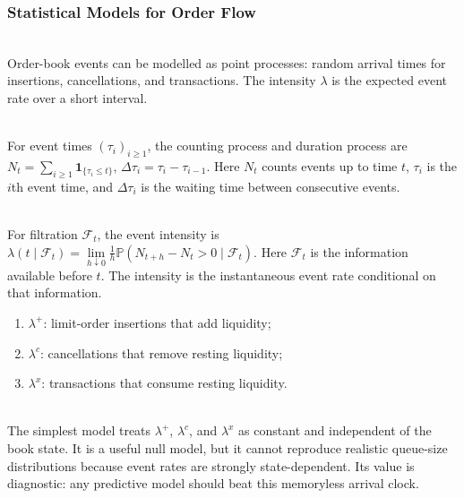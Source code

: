 \subsubsection{Statistical Models for Order Flow}

\begin{definition} \\
Order-book events can be modelled as point processes: random arrival times for insertions, cancellations, and transactions. The intensity $\lambda$ is the expected event rate over a short interval.
\end{definition}

\begin{definition} \\
For event times $(\tau_i)_{i\geq1}$, the counting process and duration process are $N_t=\sum\limits_{i\geq1}\mathbf{1}_{\{\tau_i\leq t\}}$, $\Delta\tau_i=\tau_i-\tau_{i-1}$. Here $N_t$ counts events up to time $t$, $\tau_i$ is the $i$th event time, and $\Delta\tau_i$ is the waiting time between consecutive events.
\end{definition}

\begin{definition} \\
For filtration $\mathcal{F}_t$, the event intensity is $\lambda(t\mid\mathcal{F}_t)=\lim\limits_{h\downarrow0}\frac{1}{h}\mathbb{P}(N_{t+h}-N_t>0\mid\mathcal{F}_t)$. Here $\mathcal{F}_t$ is the information available before $t$. The intensity is the instantaneous event rate conditional on that information.
\end{definition}

\begin{taxonomy} 
\begin{enumerate}[label=\roman*.]
\setlength{\itemsep}{0pt}
\item $\lambda^+$: limit-order insertions that add liquidity;
\item $\lambda^c$: cancellations that remove resting liquidity;
\item $\lambda^x$: transactions that consume resting liquidity.
\end{enumerate}
\end{taxonomy}

\begin{model} \\
The simplest model treats $\lambda^+$, $\lambda^c$, and $\lambda^x$ as constant and independent of the book state. It is a useful null model, but it cannot reproduce realistic queue-size distributions because event rates are strongly state-dependent. Its value is diagnostic: any predictive model should beat this memoryless arrival clock.
\end{model}

